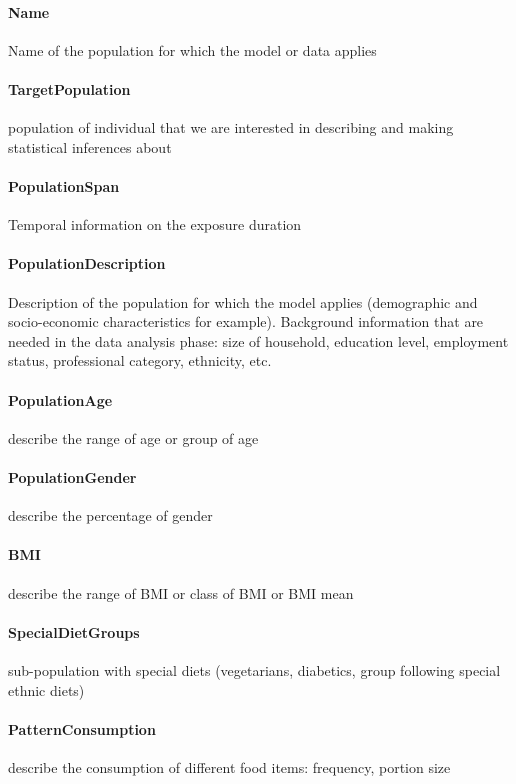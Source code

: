 \documentclass[a4paper]{report}
\begin{document}
\paragraph{Name}
Name of the population for which the model or data applies

\paragraph{TargetPopulation}
population of individual that we are interested in describing and making statistical inferences about

\paragraph{PopulationSpan}
Temporal information on the exposure duration

\paragraph{PopulationDescription}
Description of the population for which the model applies (demographic and socio-economic characteristics for example). Background information that are needed in the data analysis phase: size of household, education level, employment status, professional category, ethnicity, etc.

\paragraph{PopulationAge}
describe the range of age or group of age

\paragraph{PopulationGender}
describe the percentage of gender

\paragraph{BMI}
describe the range of BMI or class of BMI or BMI mean

\paragraph{SpecialDietGroups}
sub-population with special diets (vegetarians, diabetics, group following special ethnic diets)

\paragraph{PatternConsumption}
describe the consumption of different food items: frequency, portion size
\end{document}
